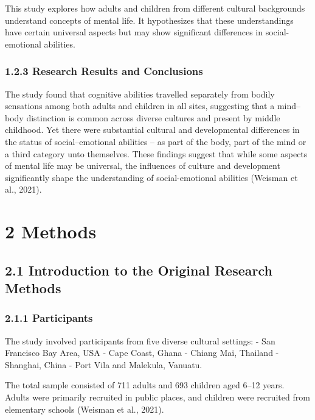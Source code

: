 \documentclass[
  man]{apa6}
\begin{document}
This study explores how adults and children from different cultural backgrounds understand concepts of mental life. It hypothesizes that these understandings have certain universal aspects but may show significant differences in social-emotional abilities.

\hypertarget{research-results-and-conclusions}{%
\subsubsection{1.2.3 Research Results and Conclusions}\label{research-results-and-conclusions}}

The study found that cognitive abilities travelled separately from bodily sensations among both adults and children in all sites, suggesting that a mind--body distinction is common across diverse cultures and present by middle childhood. Yet there were substantial cultural and developmental differences in the status of social--emotional abilities -- as part of the body, part of the mind or a third category unto themselves. These findings suggest that while some aspects of mental life may be universal, the influences of culture and development significantly shape the understanding of social-emotional abilities (Weisman et al., 2021).

\hypertarget{methods}{%
\section{2 Methods}\label{methods}}

\hypertarget{introduction-to-the-original-research-methods}{%
\subsection{2.1 Introduction to the Original Research Methods}\label{introduction-to-the-original-research-methods}}

\hypertarget{participants}{%
\subsubsection{2.1.1 Participants}\label{participants}}

The study involved participants from five diverse cultural settings: -
San Francisco Bay Area, USA - Cape Coast, Ghana - Chiang Mai, Thailand -
Shanghai, China - Port Vila and Malekula, Vanuatu.

The total sample consisted of 711 adults and 693 children aged 6--12
years. Adults were primarily recruited in public places, and children
were recruited from elementary schools (Weisman et al., 2021).
\end{document}
